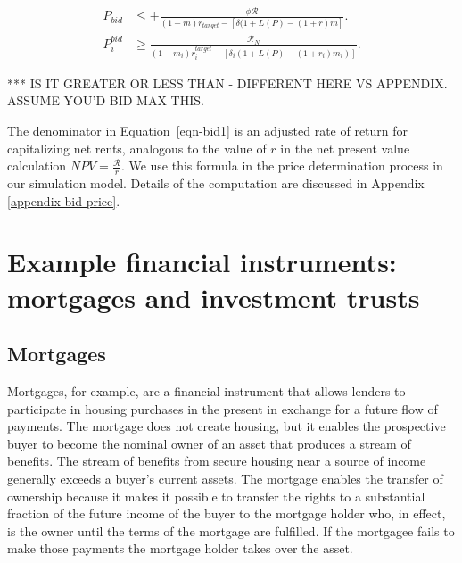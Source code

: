 \begin{align}
P_{bid}   &\le    +\frac{\phi \mathcal{R}}{(1-m)r_{target}-\left[ \delta(1+L(P)- (1+r)m\right]}. \nonumber \\
P_i^{bid} & \ge   \frac{ \mathcal{R}_N}{(1-m_i)r_i^{target}-\left[ \delta_i(1+L(P)- (1+ r_i)m_i)\right]}.
\label{eqn-bid1}
\end{align}

*** IS IT GREATER OR LESS THAN - DIFFERENT HERE VS APPENDIX. ASSUME YOU'D BID MAX THIS.

The denominator in Equation~\ref{eqn-bid1} is an adjusted rate of return for capitalizing net rents, analogous to the value of $r$ in the net present value calculation $NPV=\frac{\mathcal{R}}{r}$. 
We use this formula in the price determination process in our simulation model. Details of the computation are discussed in Appendix \ref{appendix-bid-price}. 



\section{Example financial instruments: mortgages and investment trusts}

\subsection{Mortgages}

Mortgages, for example, are a financial instrument that allows lenders to  participate in housing purchases in the present in exchange for a future flow of payments.  The mortgage does not create housing, but it enables the prospective buyer to become the nominal owner of an asset that produces a stream of benefits. The stream of benefits from secure housing near a source of income generally exceeds a buyer's current assets. The mortgage enables the  transfer of ownership because it makes it possible to transfer the rights to a substantial fraction of the future income of the buyer to the mortgage holder who, in effect, is the owner until the terms of the mortgage are fulfilled.  If the mortgagee fails to make those payments the mortgage holder takes over the asset. 

